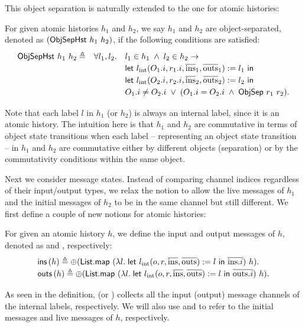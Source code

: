 This object separation is naturally extended to the one for atomic histories:
\begin{definition}\label{def-obj-comm}
  For given atomic histories $h_1$ and $h_2$, we say $h_1$ and $h_2$ are object-separated, denoted as $(\mathsf{ObjSepHst}\ h_1\ h_2)$, if the following conditions are satisfied:
  \begin{displaymath}
    \renewcommand{\arraystretch}{1.2}
    \begin{array}{rcl}
      \objseph{h_1}{h_2} \triangleq & \forall l_1, l_2. & l_1 \in h_1 \;\wedge\; l_2 \in h_2 \to\\
      & & \mathsf{let}\ \lblInt{\idxOf{O_1}}{\idxOf{r_1}}{\listof{\mathrm{ins}}_1}{\listof{\mathrm{outs}}_1} := l_1\ \mathsf{in}\\
      & & \mathsf{let}\ \lblInt{\idxOf{O_2}}{\idxOf{r_2}}{\listof{\mathrm{ins}}_2}{\listof{\mathrm{outs}}_2} := l_2\ \mathsf{in}\\
      & & \idxOf{O_1} \neq \idxOf{O_2} \;\vee\; (\idxOf{O_1} = \idxOf{O_2} \;\wedge\; \objsep{r_1}{r_2}).
    \end{array}
  \end{displaymath}
\end{definition}
Note that each label $l$ in $h_1$ (or $h_2$) is always an internal label, since it is an atomic history.
The intuition here is that $h_1$ and $h_2$ are commutative in terms of object state transitions when each label -- representing an object state transition -- in $h_1$ and $h_2$ are commutative either by different objects (separation) or by the commutativity conditions within the same object.

Next we consider message states.
Instead of comparing channel indices regardless of their input/output types, we relax the notion to allow the live messages of $h_1$ and the initial messages of $h_2$ to be in the same channel but still different.
We first define a couple of new notions for atomic histories:
\begin{definition}
  For given an atomic history $h$, we define the input and output messages of $h$, denoted as  and , respectively:
  \begin{displaymath}
    \renewcommand{\arraystretch}{1.2}
    \begin{array}{l}
      \ainputs{h} \triangleq \listconcat{(\mathsf{List.map}\ (\lambda l.\; \mathsf{let}\ \lblInt{o}{r}{\listof{\mathrm{ins}}}{\listof{\mathrm{outs}}} := l\ \mathsf{in}\ \listof{\idxOf{\mathrm{ins}}})\ h)}.\\
      \aoutputs{h} \triangleq \listconcat{(\mathsf{List.map}\ (\lambda l.\; \mathsf{let}\ \lblInt{o}{r}{\listof{\mathrm{ins}}}{\listof{\mathrm{outs}}} := l\ \mathsf{in}\ \listof{\idxOf{\mathrm{outs}}})\ h)}.
    \end{array}
  \end{displaymath}
\end{definition}
As seen in the definition,  (or ) collects all the input (output) message channels of the internal labels, respectively.
We will also use  and  to refer to the initial messages and live messages of $h$, respectively.

